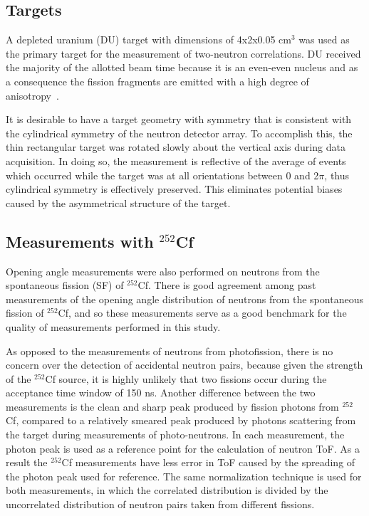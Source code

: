 \subsection{Targets}
A depleted uranium (DU) target with dimensions of 4x2x0.05 $\text{cm}^3$ was used as the primary target for the measurement of two-neutron correlations.
DU received the majority of the allotted beam time because it is an even-even nucleus and as a consequence the fission fragments are emitted with a high degree of anisotropy~\cite{1977FragAss}.

It is desirable to have a target geometry with symmetry that is consistent with the cylindrical symmetry of the neutron detector array.
To accomplish this, the thin rectangular target was rotated slowly about the vertical axis during data acquisition.
In doing so, the measurement is reflective of the average of events which occurred while the target was at all orientations between 0 and 2$\pi$, thus cylindrical symmetry is effectively preserved.
This eliminates potential biases caused by the asymmetrical structure of the target.

\subsection{Measurements with $^{252}$Cf}

Opening angle measurements were also performed on neutrons from the spontaneous fission (SF) of $^{252}$Cf.
There is good agreement among past measurements of the opening angle distribution of neutrons from the spontaneous fission of $^{252}$Cf, and so these measurements serve as a good benchmark for the quality of measurements performed in this study.

As opposed to the measurements of neutrons from photofission, there is no concern over the detection of accidental neutron pairs, because given the strength of the $^{252}$Cf source, it is highly unlikely that two fissions occur during the acceptance time window of 150 ns.
Another difference between the two measurements is the clean and sharp peak produced by fission photons from $^{252}$Cf, compared to a relatively smeared peak produced by photons scattering from the target during measurements of photo-neutrons.
In each measurement, the photon peak is used as a reference point for the calculation of neutron ToF.
As a result the $^{252}$Cf measurements have less error in ToF caused by the spreading of the photon peak used for reference.
The same normalization technique is used for both measurements, in which the correlated distribution is divided by the uncorrelated distribution of neutron pairs taken from different fissions.

